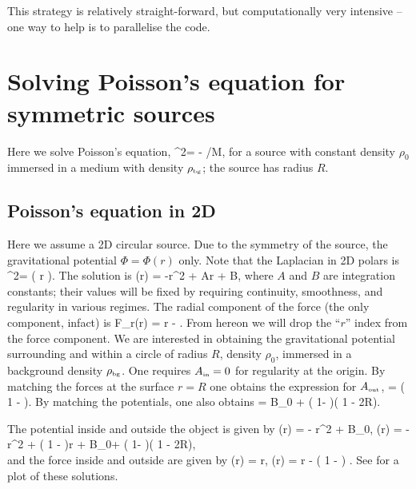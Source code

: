 \documentclass[a4paper, 12pt]{article}
\numberwithin{equation}{section}
\begin{document}
This strategy is relatively straight-forward, but computationally very intensive -- one way to help is to parallelise the code.
\section{Solving Poisson's equation for symmetric sources}
\label{poissonseqsoln}
Here we solve Poisson's equation, 
\bea
\nabla^2\Phi = - \rho /M,
\eea
for a source with constant density $\rho_0$ immersed in a medium with density ${\rho}_{\scriptscriptstyle{\textrm{bg}}}$; the source has radius $R$.
\subsection{Poisson's equation in 2D}

Here we assume a 2D  circular source. Due to the symmetry of the source, the gravitational potential $\Phi = \Phi(r)$ only. Note that the Laplacian in 2D polars is
\bea
\nabla^2\Phi = \left( r \right).
\eea
The solution is
\bea
\Phi(r) = -r^2 + A\ln r + B,
\eea
where $A$ and $B$ are integration constants; their values will be fixed by requiring continuity, smoothness, and regularity in various regimes. The radial component of the force (the only component, infact) is
\bea
F_r(r) =  r - .
\eea
From hereon we will drop the ``$r$'' index from the force component.
We are interested in obtaining the gravitational potential surrounding and within a circle of radius $R$, density $\rho_0$, immersed in a background density ${\rho}_{\scriptscriptstyle{\textrm{bg}}}$. One requires ${A}_{\scriptscriptstyle{\textrm{in}}}=0$ for regularity at the origin. By matching the forces at the surface $r=R$ one obtains the   expression for ${A}_{\scriptscriptstyle{\textrm{out}}}$,
\bse
\bea
{} = \left( 1 - \right).
\eea
By matching the potentials, one also obtains
\bea
{} = B_0 + \left( 1- \right)\left( 1 - 2\ln R\right).
\eea
\ese


The potential inside and outside the object is given by
\bse
\label{poiss-soln-1}
\bea
{}(r) = - r^2 + B_0,
\eea
\bea
{}(r) = - r^2 +  \left( 1 - \right)\ln r + B_0+ \left( 1- \right)\left( 1 - 2\ln R\right),\nonumber\\
\eea
\ese
and the force inside and outside are given by
\bse
\label{poiss-soln-2}
\bea
{}(r) = r,
\eea
\bea
{}(r) =  r -   \left( 1 - \right)  .
\eea
\ese
See  for a plot of these solutions.
\end{document}
